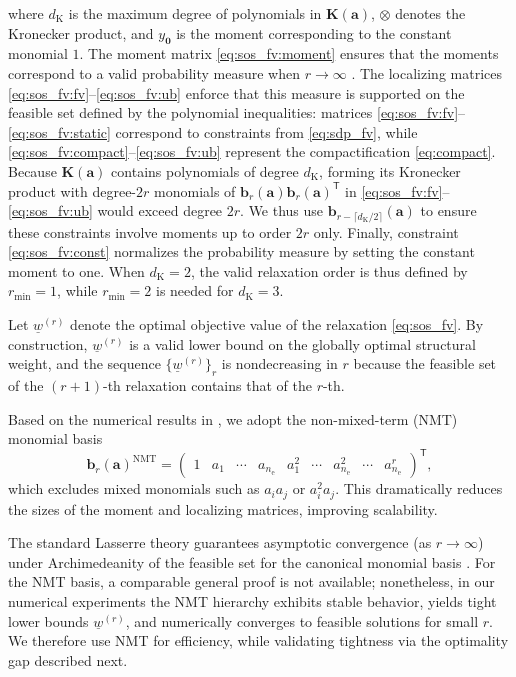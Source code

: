 \documentclass[preprint,3p]{elsarticle}
\newcommand{\T}{^{\mathsf T}}
\newcommand{\nel}{n_\mathrm{e}}
\newcommand{\dK}{d_\mathrm{K}}
\numberwithin{equation}{section}
\begin{document}
where $\dK$ is the maximum degree of polynomials in $\mathbf{K}(\mathbf{a})$, $\otimes$ denotes the Kronecker product, and $y_\mathbf{0}$ is the moment corresponding to the constant monomial $1$. The moment matrix \eqref{eq:sos_fv:moment} ensures that the moments correspond to a valid probability measure when $r\rightarrow \infty$ \citep{Henrion2006}. The localizing matrices \eqref{eq:sos_fv:fv}--\eqref{eq:sos_fv:ub} enforce that this measure is supported on the feasible set defined by the polynomial inequalities: matrices \eqref{eq:sos_fv:fv}--\eqref{eq:sos_fv:static} correspond to constraints from \eqref{eq:sdp_fv}, while \eqref{eq:sos_fv:compact}--\eqref{eq:sos_fv:ub} represent the compactification \eqref{eq:compact}. Because $\mathbf{K}(\mathbf{a})$ contains polynomials of degree $\dK$, forming its Kronecker product with degree-$2r$ monomials of $\mathbf{b}_r(\mathbf{a}) \mathbf{b}_r(\mathbf{a})\T$ in \eqref{eq:sos_fv:fv}--\eqref{eq:sos_fv:ub} would exceed degree $2r$. We thus use $\mathbf{b}_{r-\lceil \dK/2\rceil} (\mathbf{a})$ to ensure these constraints involve moments up to order $2r$ only. Finally, constraint \eqref{eq:sos_fv:const} normalizes the probability measure by setting the constant moment to one. When $\dK=2$, the valid relaxation order is thus defined by $r_{\min}= 1$, while $r_{\min}=2$ is needed for $\dK=3$.

Let $\underline{w}^{(r)}$ denote the optimal objective value of the relaxation \eqref{eq:sos_fv}. By construction, $\underline{w}^{(r)}$ is a valid lower bound on the globally optimal structural weight, and the sequence $\{\underline{w}^{(r)}\}_r$ is nondecreasing in $r$ because the feasible set of the $(r{+}1)$-th relaxation contains that of the $r$-th.

Based on the numerical results in \citep{Handa2025,Tyburec2024global}, we adopt the non-mixed-term (NMT) monomial basis
%
\begin{equation}\label{eq:nmt}
  \mathbf{b}_r(\mathbf{a})^{\mathrm{NMT}}
  =
  \begin{pmatrix}
    1 & a_1 & \cdots & a_{\nel} & a_1^2 & \cdots & a_{\nel}^2 & \cdots & a_{\nel}^r
  \end{pmatrix}\T,
\end{equation}
%
which excludes mixed monomials such as $a_i a_j$ or $a_i^2 a_j$. This dramatically reduces the sizes of the moment and localizing matrices, improving scalability.

The standard Lasserre theory guarantees asymptotic convergence (as $r\!\to\!\infty$) under Archimedeanity of the feasible set for the canonical monomial basis \citep{Lasserre2001,Henrion2006}. For the NMT basis, a comparable general proof is not available; nonetheless, in our numerical experiments the NMT hierarchy exhibits stable behavior, yields tight lower bounds $\underline{w}^{(r)}$, and numerically converges to feasible solutions for small $r$. We therefore use NMT for efficiency, while validating tightness via the optimality gap described next.
\end{document}
